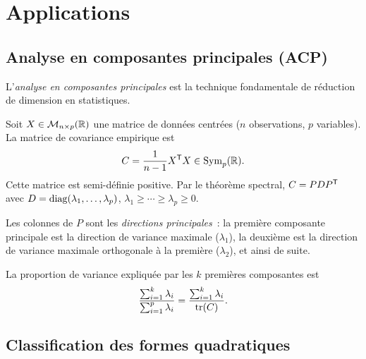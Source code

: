 \section{Applications}\label{sec:spectral-applications}

\subsection{Analyse en composantes principales (ACP)}%
\label{subsec:acp}

L'\emph{analyse en composantes principales}
est la technique fondamentale de réduction de dimension en statistiques.

Soit $X \in \mathcal{M}_{n \times p}({\mathbb{R}})$ une matrice de données centrées
($n$ observations, $p$ variables). La matrice de covariance empirique est
\[
  C = \frac{1}{n-1}{X}^{\mathsf{T}}X \in \operatorname{Sym}_p({\mathbb{R}}).
\]
Cette matrice est semi-définie positive. Par le théorème spectral,
$C = P D {P}^{\mathsf{T}}$ avec $D = \operatorname{diag}(\lambda_1, \ldots, \lambda_p)$,
$\lambda_1 \geq \cdots \geq \lambda_p \geq 0$.

Les colonnes de $P$ sont les \emph{directions principales}~: la première
composante principale est la direction de variance maximale ($\lambda_1$),
la deuxième est la direction de variance maximale orthogonale à la première
($\lambda_2$), et ainsi de suite.

La proportion de variance expliquée par les $k$ premières composantes est
\[
  \frac{\sum_{i=1}^{k} \lambda_i}{\sum_{i=1}^{p} \lambda_i} = \frac{\sum_{i=1}^{k} \lambda_i}{\operatorname{tr}(C)}.
\]

\subsection{Classification des formes quadratiques}%
\label{subsec:formes-quad}

